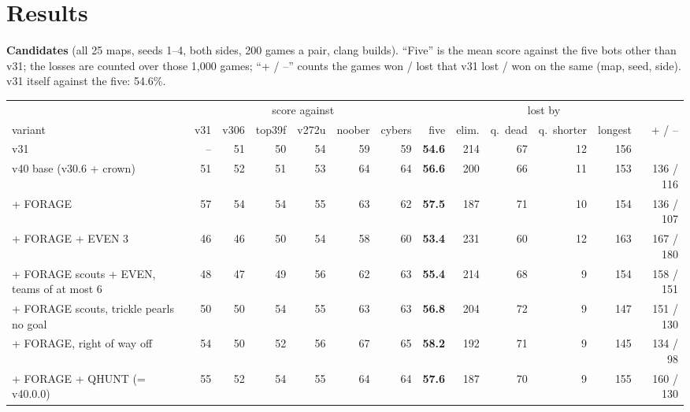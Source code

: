 \documentclass[11pt,a4paper]{article}
\begin{document}
\section{Results}
\textbf{Candidates} (all 25 maps, seeds 1--4, both sides, 200 games a pair, clang builds). ``Five'' is the mean score
against the five bots other than v31; the losses are counted over those 1,000 games; ``+ / --'' counts the games won /
lost that v31 lost / won on the same (map, seed, side). v31 itself against the five: 54.6\%.
\begin{center}
\small
\begin{tabular}{>{\raggedright\arraybackslash}p{4.6cm}rrrrrrrrrrrr}
  & \multicolumn{6}{c}{score against} & & \multicolumn{4}{c}{lost by} & \\
variant & v31 & v306 & top39f & v272u & noober & cybers & five & elim. & q.\ dead & q.\ shorter & longest & + / -- \\ \hline
  v31 & -- & 51 & 50 & 54 & 59 & 59 & \textbf{54.6} & 214 & 67 & 12 & 156 &  \\
  v40 base (v30.6 + crown) & 51 & 52 & 51 & 53 & 64 & 64 & \textbf{56.6} & 200 & 66 & 11 & 153 & 136 / 116 \\
  + FORAGE & 57 & 54 & 54 & 55 & 63 & 62 & \textbf{57.5} & 187 & 71 & 10 & 154 & 136 / 107 \\
  + FORAGE + EVEN 3 & 46 & 46 & 50 & 54 & 58 & 60 & \textbf{53.4} & 231 & 60 & 12 & 163 & 167 / 180 \\
  + FORAGE scouts + EVEN, teams of at most 6 & 48 & 47 & 49 & 56 & 62 & 63 & \textbf{55.4} & 214 & 68 & 9 & 154 & 158 / 151 \\
  + FORAGE scouts, trickle pearls no goal & 50 & 50 & 54 & 55 & 63 & 63 & \textbf{56.8} & 204 & 72 & 9 & 147 & 151 / 130 \\
  + FORAGE, right of way off & 54 & 50 & 52 & 56 & 67 & 65 & \textbf{58.2} & 192 & 71 & 9 & 145 & 134 / 98 \\
  + FORAGE + QHUNT (= v40.0.0) & 55 & 52 & 54 & 55 & 64 & 64 & \textbf{57.6} & 187 & 70 & 9 & 155 & 160 / 130 \\
\end{tabular}
\normalsize
\end{center}
\end{document}
